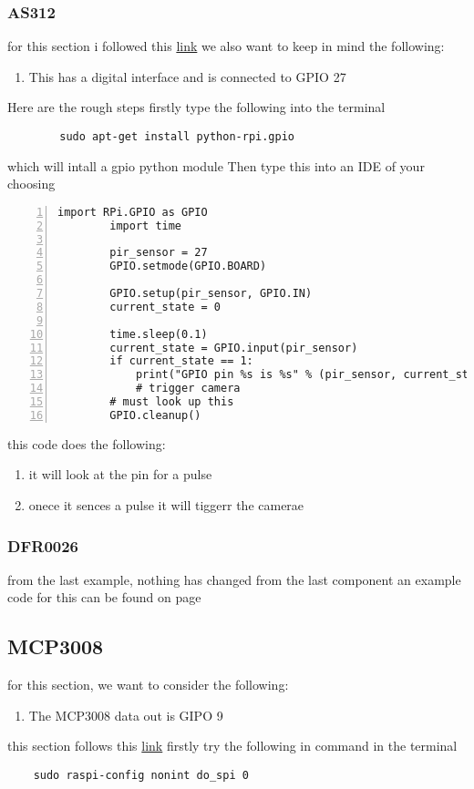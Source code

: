 	\subsubsection{AS312}
	for this section i followed  this \href{https://pimylifeup.com/raspberry-pi-motion-sensor/}{link}
	we also want to keep in mind the following:
	\begin{enumerate}
		\item This has a  digital interface and is connected  to GPIO 27 
	\end{enumerate}
	Here are the rough steps firstly  type the following into the  terminal 
	\begin{verbatim}
		sudo apt-get install python-rpi.gpio
	\end{verbatim}
	which will  intall a gpio python module
	\newpage
	Then type this into an IDE of your  choosing
	\begin{lstlisting}[style=mystyle,caption={Example code for AS312},numbers=left,firstnumber=1]
		import RPi.GPIO as GPIO
		import time

		pir_sensor = 27
		GPIO.setmode(GPIO.BOARD)

		GPIO.setup(pir_sensor, GPIO.IN)
		current_state = 0
		
		time.sleep(0.1)
		current_state = GPIO.input(pir_sensor)
		if current_state == 1:
			print("GPIO pin %s is %s" % (pir_sensor, current_state))
			# trigger camera
		# must look up this 
		GPIO.cleanup()
	\end{lstlisting}
	this code does the  following:
	\begin{enumerate}
		\item it will look at the  pin for a pulse 
		\item onece it sences a pulse  it will tiggerr  the camerae
	\end{enumerate}
	\subsubsection{DFR0026}	
	from the last example, nothing has changed from the last component
	an example code for this can be found on page \pageref{adc code}
	\subsection{MCP3008}
	for this section, we want to consider the following:
	\begin{enumerate}
		\item The MCP3008 data out is GIPO 9 
	\end{enumerate}
	this section follows this \href{https://randomnerdtutorials.com/raspberry-pi-analog-inputs-python-mcp3008/}{link}
	firstly try the following in command in the terminal 
	\begin{verbatim}
	sudo raspi-config nonint do_spi 0
	\end{verbatim}
	
